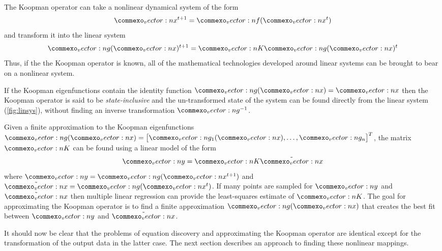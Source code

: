 \documentclass{article}
\renewcommand{\vec}[1]{\vect{#1}}
\newcommand{\mat}[1]{\vect{#1}}
\begin{document}
The Koopman operator can take a nonlinear dynamical system of the form
\begin{equation}
\vec{x}^{t+1} = \vec{f}(\vec{x}^t)
\end{equation}
and transform it into the linear system
\begin{equation}
\label{fig:linsys}
\vec{g}(\vec{x})^{t+1} = \mat{K} \vec{g}(\vec{x})^{t}
\end{equation}
Thus, if the the Koopman operator is known, all of the mathematical technologies developed around linear systems can be brought to bear on a nonlinear system. 

If the Koopman eigenfunctions contain the identity function $\vec{g}(\vec{x}) = \vec{x}$ then the Koopman operator is said to be \emph{state-inclusive} and the un-transformed state of the system can be found directly from the linear system (\cref{fig:linsys}), without finding an inverse transformation $\vec{g}^{-1}$.

Given a finite approximation to the Koopman eigenfunctions $\vec{g}(\vec{x}) = \begin{bmatrix} \vec{g}_1(\vec{x}), \ldots, \vec{g}_n \end{bmatrix}^T$, the matrix $\mat{K}$ can be found using a linear model of the form 
\begin{equation}
\vec{y} = \mat{K} \tilde{\vec{x}}
\end{equation} 
where $\vec y = \vec{g}(\vec{x}^{t+1})$ and $\tilde{\vec{x}} = \vec{g}(\vec{x}^t)$. If many points are sampled for $\vec{y}$ and $\tilde{\vec{x}}$ then multiple linear regression can provide the least-squares estimate of $\mat{K}$. The goal for approximating the Koopman operator is to find a finite approximation $\vec{g}(\vec{x})$ that creates the best fit between $\vec{y}$ and $\tilde{\vec{x}}$.

It should now be clear that the problems of equation discovery and approximating the Koopman operator are identical except for the transformation of the output data in the latter case. The next section describes an approach to finding these nonlinear mappings.
\end{document}
